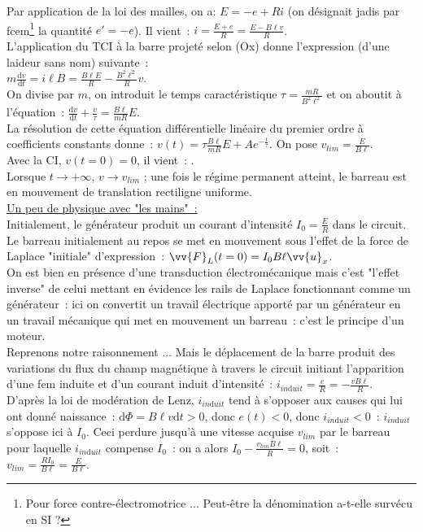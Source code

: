 \documentclass{article}
\renewcommand\overrightarrow{\vv}
\begin{document}
Par application de la loi des mailles, on a: $E = -e+Ri$ (on
désignait jadis par fcem\footnote{Pour force contre-électromotrice
... Peut-être la dénomination a-t-elle survécu en SI ?} la quantité
$e' = -e$). Il
vient : $i = \frac{E+e}{R} = \frac{E-B\ell v}{R}$. \\
L'application du TCI à la barre projeté selon (Ox) donne l'expression (d'une laideur sans nom) suivante : \\
$m\frac{\mathrm{d}v}{\mathrm{d}t} = i\ell B = \frac{B \ell E}{R} -
\frac{B^{2}\ell^{2}}{R}v$. \\
On divise par $m$, on introduit le
temps caractéristique $\tau = \frac{mR}{B^{2}\ell^{2}}$ et on
aboutit à
l'équation : $\frac{\mathrm{d}v}{\mathrm{d}t}+\frac{v}{\tau} = \frac{B\ell}{mR}E$. \\
La résolution de cette équation différentielle linéaire du premier
ordre à coefficients constants donne : $v(t) = \tau\frac{B\ell}{mR}E
+Ae^{-\frac{t}{\tau}}$. On pose $v_{lim} = \frac{E}{B\ell}$. \\
Avec la CI, $v(t=0) = 0$, il vient : . \\
Lorsque $t \rightarrow +\infty$, $v \rightarrow v_{lim}$ ; une fois
le régime permanent atteint, le barreau est en mouvement de
translation rectiligne uniforme. \\
\underline{Un peu de physique avec "les mains" :} \\
Initialement, le générateur produit un courant d'intensité $I_{0} =
\frac{E}{R}$ dans le circuit. Le barreau initialement au repos se
met en mouvement sous l'effet de la force de Laplace "initiale"
d'expression : $\overrightarrow{F}_{L} (t=0) =
I_{0}B \ell\overrightarrow{u}_{x}$. \\
On est bien en présence d'une transduction électromécanique mais
c'est "l'effet inverse" de celui mettant en évidence les rails de
Laplace fonctionnant comme un générateur : ici on convertit un
travail électrique apporté par un générateur en un travail mécanique
qui met en mouvement un barreau : c'est le principe d'un moteur.\\
Reprenons notre raisonnement ... Mais le déplacement de la barre
produit des variations du flux du champ magnétique à travers le
circuit initiant l'apparition d'une fem induite et d'un courant
induit d'intensité : $i_{in\mathrm{d}uit} =
\frac{e}{R} = -\frac{vB\ell}{R}$. \\
D'après la loi de modération de Lenz, $i_{in\mathrm{d}uit}$ tend à s'opposer
aux causes qui lui ont donné naissance : $\mathrm{d}\Phi = B\ell v \mathrm{d}t >0$,
donc $e(t) < 0$, donc $i_{in\mathrm{d}uit} < 0$ : $i_{in\mathrm{d}uit}$ s'oppose ici à
$I_{0}$. Ceci perdure jusqu'à une vitesse acquise $v_{lim}$ par le
barreau pour laquelle $i_{in\mathrm{d}uit}$ compense $I_{0}$ : on a alors
$I_{0}-\frac{v_{lim}B\ell}{R}=0$, soit : $v_{lim} = \frac{RI_{0}}{B
\ell} = \frac{E}{B \ell}$.\\
\end{document}
